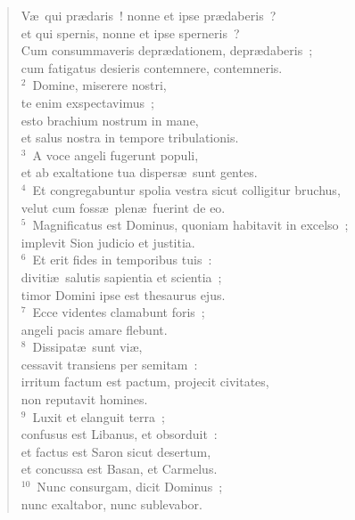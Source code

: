 \begin{flushleft}\begin{verse}\vspace{-19pt}\hspace{6pt}V\ae\ qui pr\ae daris~! nonne et ipse pr\ae daberis~?\\\hspace{6pt} et qui spernis, nonne et ipse sperneris~?\\ Cum consummaveris depr\ae dationem, depr\ae daberis~;\\ cum fatigatus desieris contemnere, contemneris.\\
${}^{2}$~Domine, miserere nostri,\\ te enim exspectavimus~;\\ esto brachium nostrum in mane,\\ et salus nostra in tempore tribulationis.\\
${}^{3}$~A voce angeli fugerunt populi,\\ et ab exaltatione tua dispers\ae\ sunt gentes.\\
${}^{4}$~Et congregabuntur spolia vestra sicut colligitur bruchus,\\ velut cum foss\ae\ plen\ae\ fuerint de eo.\\
${}^{5}$~Magnificatus est Dominus, quoniam habitavit in excelso~;\\ implevit Sion judicio et justitia.\\
${}^{6}$~Et erit fides in temporibus tuis~:\\ diviti\ae\ salutis sapientia et scientia~;\\ timor Domini ipse est thesaurus ejus.\\
${}^{7}$~Ecce videntes clamabunt foris~;\\ angeli pacis amare flebunt.\\
${}^{8}$~Dissipat\ae\ sunt vi\ae ,\\ cessavit transiens per semitam~:\\ irritum factum est pactum, projecit civitates,\\ non reputavit homines.\\
${}^{9}$~Luxit et elanguit terra~;\\ confusus est Libanus, et obsorduit~:\\ et factus est Saron sicut desertum,\\ et concussa est Basan, et Carmelus.\\
${}^{10}$~Nunc consurgam, dicit Dominus~;\\ nunc exaltabor, nunc sublevabor.\\

\end{verse}
\end{flushleft}
